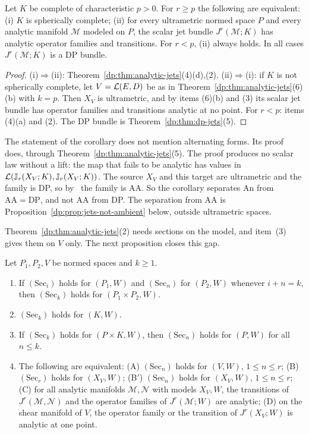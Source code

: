 \begin{corollary}\label{dp:cor:jet-dichotomy}
Let $K$ be complete of characteristic $p>0$. For $r\ge p$ the following are equivalent: \textup{(i)} $K$ is spherically complete; \textup{(ii)} for every ultrametric normed space $P$ and every analytic manifold $\mathcal M$ modeled on $P$, the scalar jet bundle $J^r(\mathcal M;K)$ has analytic operator families and transitions. For $r<p$, \textup{(ii)} always holds. In all cases $J^r(\mathcal M;K)$ is a DP bundle.
\end{corollary}

\begin{proof}
(i)$\Rightarrow$(ii): Theorem~\ref{dp:thm:analytic-jets}(4)(d),(2). (ii)$\Rightarrow$(i): if $K$ is not spherically complete, let $V=\mathcal L(E,D)$ be as in Theorem~\ref{dp:thm:analytic-jets}(6)(b) with $k=p$. Then $X_V$ is ultrametric, and by items (6)(b) and (3) its scalar jet bundle has operator families and transitions analytic at no point. For $r<p$: items (4)(a) and (2). The DP bundle is Theorem~\ref{dp:thm:dp-jets}(5).
\end{proof}

The statement of the corollary does not mention alternating forms. Its proof does, through Theorem~\ref{dp:thm:analytic-jets}(5). The proof produces no scalar law without a lift: the map that fails to be analytic has values in $\mathcal L(\mathbb J_r(X_V;K),\mathbb J_r(X_V;K))$. The source $X_V$ and this target are ultrametric and the family is DP, so by~\cite[Theorem~14.39(1)]{I} the family is AA. So the corollary separates An from $\mathrm{AA}=\mathrm{DP}$, and not AA from DP. The separation from AA is Proposition~\ref{dp:prop:jets-not-ambient} below, outside ultrametric spaces.

Theorem~\ref{dp:thm:analytic-jets}(2) needs sections on the model, and item~(3) gives them on $V$ only. The next proposition closes this gap.

\begin{proposition}\label{dp:prop:sec-products}
Let $P_1,P_2,V$ be normed spaces and $k\ge1$.
\begin{enumerate}
\item If $(\mathrm{Sec}_i)$ holds for $(P_1,W)$ and $(\mathrm{Sec}_n)$ for $(P_2,W)$ whenever $i+n=k$, then $(\mathrm{Sec}_k)$ holds for $(P_1\times P_2,W)$.
\item $(\mathrm{Sec}_k)$ holds for $(K,W)$.
\item If $(\mathrm{Sec}_k)$ holds for $(P\times K,W)$, then $(\mathrm{Sec}_n)$ holds for $(P,W)$ for all $n\le k$.
\item The following are equivalent: \textup{(A)} $(\mathrm{Sec}_n)$ holds for $(V,W)$, $1\le n\le r$; \textup{(B)} $(\mathrm{Sec}_r)$ holds for $(X_V,W)$; \textup{(B$'$)} $(\mathrm{Sec}_n)$ holds for $(X_V,W)$, $1\le n\le r$; \textup{(C)} for all analytic manifolds $\mathcal M,\mathcal N$ with models $X_V,W$, the transitions of $J^r(\mathcal M,\mathcal N)$ and the operator families of $J^r(\mathcal M;W)$ are analytic; \textup{(D)} on the shear manifold of $V$, the operator family or the transition of $J^r(X_V;W)$ is analytic at one point.
\end{enumerate}
\end{proposition}


